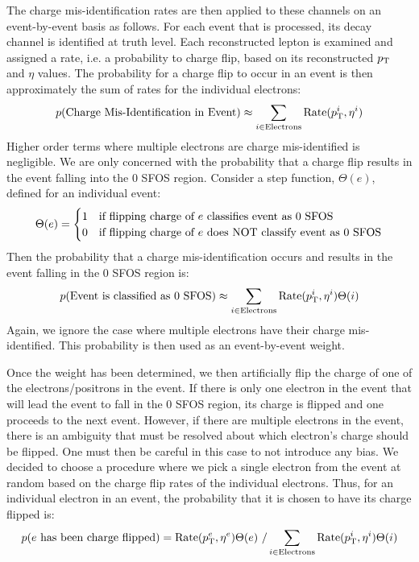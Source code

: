 The charge mis-identification rates are then applied to these channels on an 
event-by-event basis as follows.
For each event that is processed, its decay channel is identified 
at truth level. Each reconstructed lepton
is examined  and assigned a rate, i.e. a probability to charge flip, 
based on its reconstructed $p_{\mathrm{T}}$ and $\eta$ values.
The probability for a charge flip to occur in an event is then approximately 
the sum of rates for the individual electrons:
\begin{equation}
p(\textrm{Charge Mis-Identification in Event}) \approx \sum_{i \in \textrm{Electrons}}  \textrm{Rate}(\pt^i,\eta^i) 
\end{equation}
Higher order terms where multiple electrons are charge mis-identified is negligible.
We are only concerned with the probability that a charge flip results in the 
event falling into the 0 SFOS region. 
Consider a step function, $\Theta(e)$, defined for an individual event:
\[
\Theta(e) = 
\begin{cases}
\hfill 1 \hfill & \text{if flipping charge of $e$ classifies event as 0 SFOS} \\
\hfill 0 \hfill & \text{if flipping charge of $e$ does NOT classify event as 0 SFOS}\\
\end{cases}
\]
Then the probability that a charge mis-identification occurs and results in 
the event falling in the 0 SFOS region is:
\begin{equation}
p(\textrm{Event is classified as 0 SFOS}) \approx \sum_{i \in \textrm{Electrons}}  \textrm{Rate}(\pt^i,\eta^i)\Theta(i) 
\end{equation}
Again, we ignore the case where multiple electrons have their charge 
mis-identified.  This probability is then used as an event-by-event weight. 


Once the weight has been determined, we then artificially flip the charge of 
one of the electrons/positrons in the event.
If there is only one electron in the event that will lead the event 
to fall in the 0 SFOS region, its charge is flipped
and one proceeds to the next event.  However, if there are multiple electrons 
in the event, there is an ambiguity that must be resolved
about which electron's charge should be flipped. One must then be careful in 
this case to not introduce any bias.
We decided to choose a procedure where we pick a single electron from the 
event at random based on the charge flip rates
of the individual electrons. Thus, for an individual electron in an 
event, the probability that it is chosen to have its charge
flipped is:
\begin{equation}
p(\textrm{$e$ has been charge flipped}) = \textrm{Rate}(\pt^e,\eta^e)\Theta(e)~/\sum_{i \in \textrm{Electrons}} \textrm{Rate}(\pt^i,\eta^i)\Theta(i)
\end{equation}

